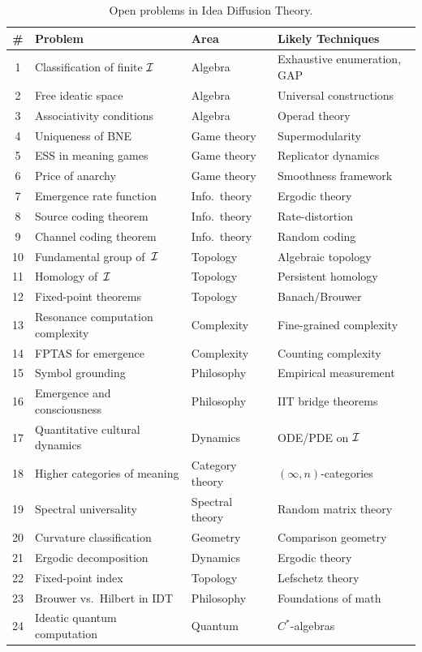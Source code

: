 \begin{table}[ht]
\centering
\small
\begin{tabular}{@{}clll@{}}
\toprule
\textbf{\#} & \textbf{Problem} & \textbf{Area} & \textbf{Likely Techniques} \\
\midrule
1  & Classification of finite $\mathcal{I}$    & Algebra     & Exhaustive enumeration, GAP \\
2  & Free ideatic space                & Algebra     & Universal constructions \\
3  & Associativity conditions          & Algebra     & Operad theory \\
4  & Uniqueness of BNE                 & Game theory & Supermodularity \\
5  & ESS in meaning games              & Game theory & Replicator dynamics \\
6  & Price of anarchy                  & Game theory & Smoothness framework \\
7  & Emergence rate function           & Info.\ theory & Ergodic theory \\
8  & Source coding theorem             & Info.\ theory & Rate-distortion \\
9  & Channel coding theorem            & Info.\ theory & Random coding \\
10 & Fundamental group of~$\mathcal{I}$        & Topology    & Algebraic topology \\
11 & Homology of~$\mathcal{I}$                 & Topology    & Persistent homology \\
12 & Fixed-point theorems              & Topology    & Banach/Brouwer \\
13 & Resonance computation complexity  & Complexity  & Fine-grained complexity \\
14 & FPTAS for emergence               & Complexity  & Counting complexity \\
15 & Symbol grounding                  & Philosophy  & Empirical measurement \\
16 & Emergence and consciousness       & Philosophy  & IIT bridge theorems \\
17 & Quantitative cultural dynamics    & Dynamics    & ODE/PDE on $\mathcal{I}$ \\
18 & Higher categories of meaning      & Category theory & $(\infty,n)$-categories \\
19 & Spectral universality             & Spectral theory & Random matrix theory \\
20 & Curvature classification          & Geometry    & Comparison geometry \\
21 & Ergodic decomposition             & Dynamics    & Ergodic theory \\
22 & Fixed-point index                 & Topology    & Lefschetz theory \\
23 & Brouwer vs.\ Hilbert in IDT      & Philosophy  & Foundations of math \\
24 & Ideatic quantum computation       & Quantum     & $C^*$-algebras \\
\bottomrule
\end{tabular}
\caption{Open problems in Idea Diffusion Theory.}
\label{tab:open-problems}
\end{table}

